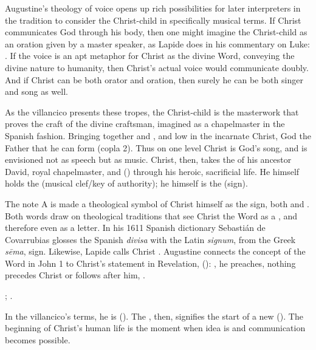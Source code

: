 Augustine's theology of voice opens up rich possibilities for later interpreters
in the tradition to consider the Christ-child in specifically musical terms.
If Christ communicates God through his body, then one might imagine the
Christ-child as an oration given by a master speaker, as Lapide does in his
commentary on Luke:
.%
    \Autocite[673, on ]{Lapide:Gospels19C} 
If the voice is an apt metaphor for Christ as the divine Word, conveying the
divine nature to humanity, then Christ's actual voice would communicate doubly.
And if Christ can be both orator and oration, then surely he can be both singer
and song as well.

As the villancico  presents these tropes, the
Christ-child is the masterwork that proves the craft of the divine craftsman,
imagined as a chapelmaster in the Spanish fashion.
Bringing together  and ,  and low
in the incarnate Christ, God the Father  that he can form
 (copla 2).
Thus on one level Christ is God's song, and  is envisioned not
as speech but as music.
Christ, then, takes the  of his ancestor David, royal
chapelmaster, and  () through his
heroic, sacrificial life.
He himself holds the  (musical clef/key of authority); he
himself is the  (sign).

The note A is made a theological symbol of Christ himself as the sign, both
 and .
Both words draw on theological traditions that see Christ the Word as a
, and therefore even as a letter.
In his 1611 Spanish dictionary Sebastián de Covarrubias glosses the Spanish
\emph{divisa} with the Latin \emph{signum}, from the Greek \emph{sēma}, sign. 
Likewise, Lapide calls Christ .%
    \Autocites
    []{Covarrubias:Tesoro}
    [685--686, on Lk 2]{Lapide:Gospels19C}
Augustine connects the concept of the Word in John 1 to Christ's statement in
Revelation,  (): , he preaches, nothing precedes Christ or follows after
him, .%
\begin{Footnote}
    ;
    \autocite[on Rv 1]{Lapide:Apocalypse1627}.
\end{Footnote}
In the villancico's terms, he is 
().
The , then, signifies the start of a new 
().
The beginning of Christ's human life is the moment when idea is  and communication becomes possible.

